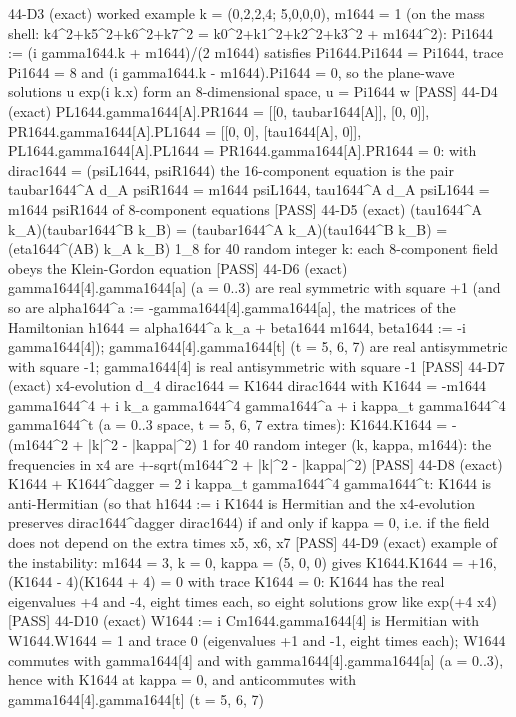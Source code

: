 \documentclass[
  10pt,
]{article}
\newenvironment{Shaded}{}{}
\newcommand{\NormalTok}[1]{#1}
\begin{document}
\begin{Shaded}
\begin{Highlighting}[]
\NormalTok{[PASS] 44{-}D3  (exact) worked example k = (0,2,2,4; 5,0,0,0), m1644 = 1 (on the mass shell: k4\^{}2+k5\^{}2+k6\^{}2+k7\^{}2 = k0\^{}2+k1\^{}2+k2\^{}2+k3\^{}2 + m1644\^{}2): Pi1644 := (i gamma1644.k + m1644)/(2 m1644) satisfies Pi1644.Pi1644 = Pi1644, trace Pi1644 = 8 and (i gamma1644.k {-} m1644).Pi1644 = 0, so the plane{-}wave solutions u exp(i k.x) form an 8{-}dimensional space, u = Pi1644 w}
\NormalTok{[PASS] 44{-}D4  (exact) PL1644.gamma1644[A].PR1644 = [[0, taubar1644[A]], [0, 0]], PR1644.gamma1644[A].PL1644 = [[0, 0], [tau1644[A], 0]], PL1644.gamma1644[A].PL1644 = PR1644.gamma1644[A].PR1644 = 0: with dirac1644 = (psiL1644, psiR1644) the 16{-}component equation is the pair  taubar1644\^{}A d\_A psiR1644 = m1644 psiL1644,  tau1644\^{}A d\_A psiL1644 = m1644 psiR1644  of 8{-}component equations}
\NormalTok{[PASS] 44{-}D5  (exact) (tau1644\^{}A k\_A)(taubar1644\^{}B k\_B) = (taubar1644\^{}A k\_A)(tau1644\^{}B k\_B) = (eta1644\^{}(AB) k\_A k\_B) 1\_8 for 40 random integer k: each 8{-}component field obeys the Klein{-}Gordon equation}
\NormalTok{[PASS] 44{-}D6  (exact) gamma1644[4].gamma1644[a] (a = 0..3) are real symmetric with square +1 (and so are alpha1644\^{}a := {-}gamma1644[4].gamma1644[a], the matrices of the Hamiltonian h1644 = alpha1644\^{}a k\_a + beta1644 m1644, beta1644 := {-}i gamma1644[4]); gamma1644[4].gamma1644[t] (t = 5, 6, 7) are real antisymmetric with square {-}1; gamma1644[4] is real antisymmetric with square {-}1}
\NormalTok{[PASS] 44{-}D7  (exact) x4{-}evolution d\_4 dirac1644 = K1644 dirac1644 with K1644 = {-}m1644 gamma1644\^{}4 + i k\_a gamma1644\^{}4 gamma1644\^{}a + i kappa\_t gamma1644\^{}4 gamma1644\^{}t (a = 0..3 space, t = 5, 6, 7 extra times): K1644.K1644 = {-}(m1644\^{}2 + |k|\^{}2 {-} |kappa|\^{}2) 1 for 40 random integer (k, kappa, m1644): the frequencies in x4 are +{-}sqrt(m1644\^{}2 + |k|\^{}2 {-} |kappa|\^{}2)}
\NormalTok{[PASS] 44{-}D8  (exact) K1644 + K1644\^{}dagger = 2 i kappa\_t gamma1644\^{}4 gamma1644\^{}t: K1644 is anti{-}Hermitian (so that h1644 := i K1644 is Hermitian and the x4{-}evolution preserves dirac1644\^{}dagger dirac1644) if and only if kappa = 0, i.e. if the field does not depend on the extra times x5, x6, x7}
\NormalTok{[PASS] 44{-}D9  (exact) example of the instability: m1644 = 3, k = 0, kappa = (5, 0, 0) gives K1644.K1644 = +16, (K1644 {-} 4)(K1644 + 4) = 0 with trace K1644 = 0: K1644 has the real eigenvalues +4 and {-}4, eight times each, so eight solutions grow like exp(+4 x4)}
\NormalTok{[PASS] 44{-}D10  (exact) W1644 := i Cm1644.gamma1644[4] is Hermitian with W1644.W1644 = 1 and trace 0 (eigenvalues +1 and {-}1, eight times each); W1644 commutes with gamma1644[4] and with gamma1644[4].gamma1644[a] (a = 0..3), hence with K1644 at kappa = 0, and anticommutes with gamma1644[4].gamma1644[t] (t = 5, 6, 7)}

\end{Highlighting}
\end{Shaded}
\end{document}

